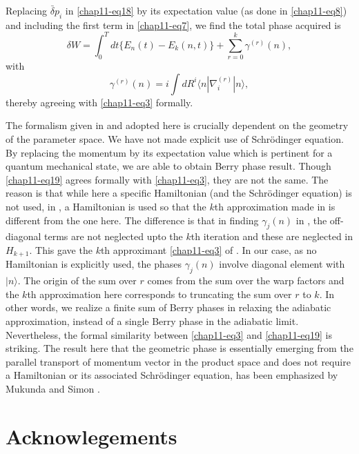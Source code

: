 Replacing $\bar{\delta}p_i$ in \eqref{chap11-eq18} by its expectation value (as done in \eqref{chap11-eq8}) and including the first term in \eqref{chap11-eq7}, we  find the total phase acquired is 
\begin{equation}
\delta W=  \int_0^T dt\{E_n(t)-E_k(n,t)\} +\sum_{r=0}^k{\gamma}^{(r)}(n), \label{chap11-eq19}
\end{equation}
with
\begin{equation}
{\gamma}^{(r)}(n)= i\int dR^i\langle n|{\nabla}^{(r)}_i|n\rangle,\label{chap11-eq20}
\end{equation}
thereby agreeing with \eqref{chap11-eq3} formally.    

The formalism given in \cite{chap11-key6, chap11-key7} and adopted here is crucially dependent on the geometry of the parameter space. We have  not made explicit use of Schr\"{o}dinger equation. By replacing the momentum by its expectation value which is pertinent  for a quantum mechanical state, we are able to obtain Berry phase result. Though \eqref{chap11-eq19} agrees formally with \eqref{chap11-eq3}, they are  not the same. The reason is that while here a specific Hamiltonian (and the Schr\"{o}dinger equation) is not used, in \cite{chap11-key5}, a  Hamiltonian is used so that the $k$th approximation made in \cite{chap11-key5} is different from the one here. The difference is that in  finding ${\gamma}_j(n)$ in \cite{chap11-key5}, the off-diagonal terms are not neglected upto the $k$th iteration and these are  neglected in $H_{k+1}$. This gave the $k$th approximant \eqref{chap11-eq3} of \cite{chap11-key5}. In our case, as no Hamiltonian is explicitly used,  the phases ${\gamma}_j(n)$ involve diagonal element with $|n\rangle$. The origin of the sum over $r$ comes from the  sum over the warp factors and the $k$th approximation here corresponds to truncating the sum over $r$ to $k$. In other  words, we realize a finite sum of Berry phases in relaxing the adiabatic approximation, instead of a single Berry  phase in the adiabatic limit.   Nevertheless, the formal similarity between \eqref{chap11-eq3} and \eqref{chap11-eq19} is striking. The result here  that the geometric phase is essentially emerging from the parallel transport of momentum vector in the product space  and does not require a Hamiltonian or its associated Schr\"{o}dinger equation, has been emphasized by Mukunda and  Simon \cite{chap11-key8}.   
\newpage

\section*{Acknowlegements}

